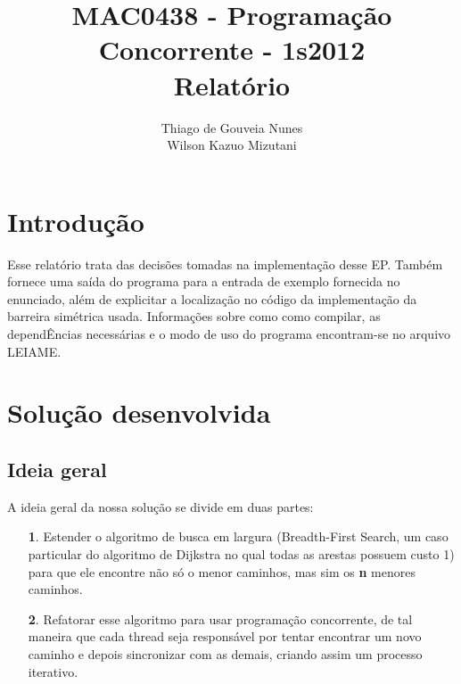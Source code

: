 \documentclass[a4paper,11pt]{article}
\begin{document}
\begin{titlepage}
  \title{MAC0438 - Programação Concorrente - 1s2012 \\ Relatório}
  \author{Thiago de Gouveia Nunes \\ Wilson Kazuo Mizutani}
  \thispagestyle{empty}
\end{titlepage}

\maketitle

\clearpage

\tableofcontents

\clearpage
\section{Introdução}
  Esse relatório trata das decisões tomadas na implementação desse EP. Também
fornece uma saída do programa para a entrada de exemplo fornecida no enunciado,
além de explicitar a localização no código da implementação da barreira
simétrica usada.
  Informações sobre como como compilar, as dependÊncias necessárias e o modo de
uso do programa encontram-se no arquivo LEIAME.

\section{Solução desenvolvida}

  \subsection{Ideia geral}
    A ideia geral da nossa solução se divide em duas partes:
      \begin{itemize}
        \item[\textbf 1.]
          Estender o algoritmo de busca em largura (Breadth-First Search, um
          caso particular do algoritmo de Dijkstra no qual todas as arestas
          possuem custo 1) para que ele encontre não só o menor caminhos, mas
          sim os {\textbf n} menores caminhos.
        \item[\textbf 2.]
          Refatorar esse algoritmo para usar programação concorrente, de tal
          maneira que cada thread seja responsável por tentar encontrar um novo
          caminho e depois sincronizar com as demais, criando assim um processo
          iterativo.
      \end{itemize}
\end{document}
